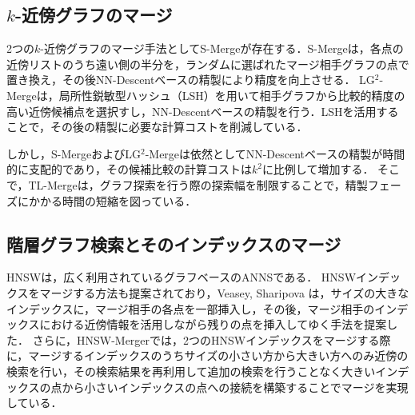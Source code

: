 \documentclass[submit,techrep,noauthor]{ipsj}
\newcommand{\lgmerge}{LG$^2$-Merge}
\begin{document}



\subsection{$k$-近傍グラフのマージ}
2つの$k$-近傍グラフのマージ手法としてS-Merge\cite{zhao_merge_2022}が存在する．S-Mergeは，各点の近傍リストのうち遠い側の半分を，ランダムに選ばれたマージ相手グラフの点で置き換え，その後NN-Descentベースの精製により精度を向上させる．
\lgmerge\cite{hashimoto_lg2merge}は，局所性鋭敏型ハッシュ（LSH）を用いて相手グラフから比較的精度の高い近傍候補点を選択すし，NN-Descentベースの精製を行う．LSHを活用することで，その後の精製に必要な計算コストを削減している．

しかし，S-Mergeおよび{\lgmerge}は依然としてNN-Descentベースの精製が時間的に支配的であり，その候補比較の計算コストは$k^2$に比例して増加する．
そこで，TL-Mergeは，グラフ探索を行う際の探索幅を制限することで，精製フェーズにかかる時間の短縮を図っている．

\subsection{階層グラフ検索とそのインデックスのマージ}
HNSW\cite{malkov_efficient_2020}は，広く利用されているグラフベースのANNSである．
HNSWインデックスをマージする方法も提案されており，Veasey, Sharipova \cite{veasey_hnsw_2025}は，サイズの大きなインデックスに，マージ相手の各点を一部挿入し，その後，マージ相手のインデックスにおける近傍情報を活用しながら残りの点を挿入してゆく手法を提案した．
さらに，HNSW-Merger\cite{jin_efficient_2026}では，2つのHNSWインデックスをマージする際に，マージするインデックスのうちサイズの小さい方から大きい方へのみ近傍の検索を行い，その検索結果を再利用して追加の検索を行うことなく大きいインデックスの点から小さいインデックスの点への接続を構築することでマージを実現している．
\end{document}
